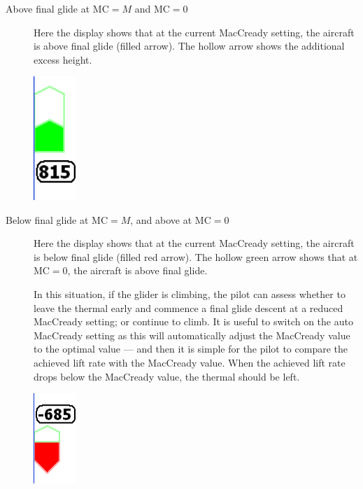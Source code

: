 \documentclass[a4paper,12pt]{refrep}
\begin{document}
\begin{description}

\item[Above final glide at MC$=M$ and MC$=0$]
  Here the display shows that at the current MacCready setting, the aircraft
  is above final glide (filled arrow).  The hollow arrow shows the additional
  excess height.

\begin{center}
\includegraphics[angle=0,width=1.6cm,keepaspectratio='true']{figures/fig-finalglide-allabove.png}
\end{center}

\item[Below final glide at MC$=M$, and above at MC$=0$]
  Here the display shows that at the current MacCready setting, the aircraft
  is below final glide (filled red arrow).  The hollow green arrow
  shows that at MC$=0$, the aircraft is above final glide.

  In this situation, if the glider is climbing, the pilot can assess
  whether to leave the thermal early and commence a final glide
  descent at a reduced MacCready setting; or continue to climb.  It is
  useful to switch on the auto MacCready setting as this will
  automatically adjust the MacCready value to the optimal value ---
  and then it is simple for the pilot to compare the achieved lift
  rate with the MacCready value.  When the achieved lift rate drops
  below the MacCready value, the thermal should be left.

\begin{center}
\includegraphics[angle=0,width=1.6cm,keepaspectratio='true']{figures/fig-finalglide-halfabove.png}
\end{center}


\end{description}
\end{document}
